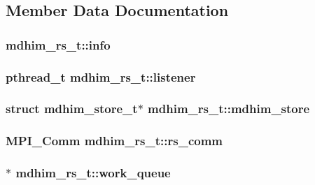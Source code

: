 \subsection{Member Data Documentation}
\hypertarget{structmdhim__rs__t_a23b6bfa000c31bbee0e71c4b6fbed2e9}{
\subsubsection[{info}]{ mdhim\-\_\-rs\-\_\-t\-::info}}\label{structmdhim__rs__t_a23b6bfa000c31bbee0e71c4b6fbed2e9}
\hypertarget{structmdhim__rs__t_a993ccccd48dfdf22dd1ced2578ed15e2}{
\subsubsection[{listener}]{\setlength{\rightskip}{0pt plus 5cm}pthread\-\_\-t mdhim\-\_\-rs\-\_\-t\-::listener}}\label{structmdhim__rs__t_a993ccccd48dfdf22dd1ced2578ed15e2}
\hypertarget{structmdhim__rs__t_aa393b01287a2253acff72c03cc5a83c5}{
\subsubsection[{mdhim\-\_\-store}]{\setlength{\rightskip}{0pt plus 5cm}struct {\bf mdhim\-\_\-store\-\_\-t}$\ast$ mdhim\-\_\-rs\-\_\-t\-::mdhim\-\_\-store}}\label{structmdhim__rs__t_aa393b01287a2253acff72c03cc5a83c5}
\hypertarget{structmdhim__rs__t_a0ed34bdf133e1d59d83d44d0fda49683}{
\subsubsection[{rs\-\_\-comm}]{\setlength{\rightskip}{0pt plus 5cm}M\-P\-I\-\_\-\-Comm mdhim\-\_\-rs\-\_\-t\-::rs\-\_\-comm}}\label{structmdhim__rs__t_a0ed34bdf133e1d59d83d44d0fda49683}
\hypertarget{structmdhim__rs__t_ab9b9e9145d08a9311917f42719937acc}{
\subsubsection[{work\-\_\-queue}]{$\ast$ mdhim\-\_\-rs\-\_\-t\-::work\-\_\-queue}}\label{structmdhim__rs__t_ab9b9e9145d08a9311917f42719937acc}
